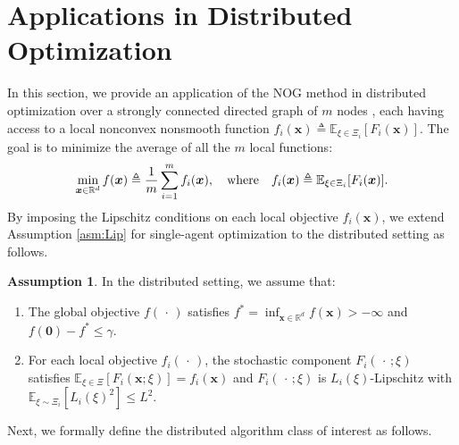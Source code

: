 \documentclass{article}
\def\vzero{{\bm{0}}}
\def\vx{{\bm{x}}}
\def\sR{{\mathbb{R}}}
\newcommand{\E}{\mathbb{E}}
\theoremstyle{definition}
\newtheorem{asm}{Assumption}[section]
\theoremstyle{remark}
\begin{document}
	\section{Applications in Distributed Optimization}
	
	In this section, we provide an application of the NOG method in distributed optimization over a strongly connected directed graph of $m$ nodes \citep{scaman2017optimal,scaman2018optimal,lu2021optimal}, each having access to a local nonconvex nonsmooth function $f_i(\vx) \triangleq \E_{\xi \in \Xi_i} [F_i(\vx)]$. The goal is to minimize the average of all the $m$ local functions:
	\begin{align} \label{prob:dist}
		\min_{\vx \in \sR^d} f(\vx) \triangleq \frac{1}{m} \sum_{i=1}^m f_i(\vx), \quad {\rm where} \quad f_i(\vx) \triangleq \E_{\xi \in \Xi_i} [F_i(\vx)].
	\end{align}
	By imposing the Lipschitz conditions on each local objective $f_i(\vx)$, we extend Assumption \ref{asm:Lip} for single-agent optimization to the distributed setting as follows. 
	
	
	\begin{asm} \label{asm:Lip-dist}
		In the distributed setting, we assume that:
		\begin{enumerate}
			\item[(a)] The global objective $f(\,\cdot\,)$ satisfies $f^* = \inf_{\vx \in \sR^d} f(\vx) > -\infty$ and $f(\vzero) -  f^* \le \gamma$.
			\item[(b)] For each local objective $f_i(\,\cdot\,)$, the 
			stochastic component $F_i(\,\cdot\,; \xi)$ satisfies $ \E_{\xi \in \Xi}[F_i(\vx; \xi)] = f_i(\vx)$ and $F_i(\,\cdot\,;\xi)$ is $L_i(\xi)$-Lipschitz with $\E_{\xi \sim \Xi_i}[L_i(\xi)^2 ] \le L^2$.
		\end{enumerate}
	\end{asm}
	Next, we formally define the distributed algorithm class of interest \citep{scaman2017optimal,scaman2018optimal} as follows.
	
\end{document}
